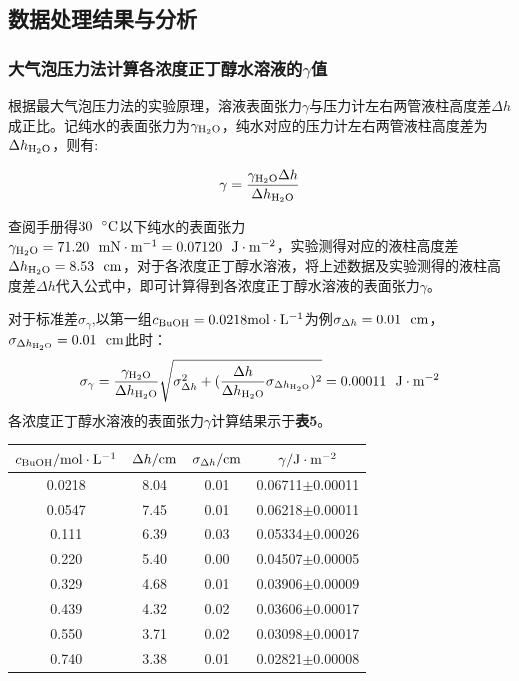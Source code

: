 \documentclass[12pt]{article}
\begin{document}
		\subsection{数据处理结果与分析}
			\subsubsection{大气泡压力法计算各浓度正丁醇水溶液的$\gamma$值}
			根据最大气泡压力法的实验原理，溶液表面张力$\gamma$与压力计左右两管液柱高度差$\Delta h$成正比。记纯水的表面张力为$\gamma_{\rm H_{2}O}$，纯水对应的压力计左右两管液柱高度差为$\Delta h_{\rm H_{2}O}$，则有:\par
			$$
			\gamma=\frac{\gamma_{\rm H_{2}O} \Delta h}{\Delta h_{\rm H_{2}O}}
			$$
			\par
			查阅手册\citealp{crc}得$30\ \ {\rm ^{\circ }C}$以下纯水的表面张力$\gamma_{\rm H_{2}O}=71.20\ \ {\rm mN\cdot m^{-1}=0.07120\ \ {\rm J\cdot m^{-2}}}$，实验测得对应的液柱高度差$\Delta h_{\rm H_{2}O}=8.53\ \ {\rm cm}$，对于各浓度正丁醇水溶液，将上述数据及实验测得的液柱高度差$\Delta h$代入公式中，即可计算得到各浓度正丁醇水溶液的表面张力$\gamma$。\par 
			对于标准差$\sigma_{\gamma}$,以第一组$c_{\rm BuOH}= 0.0218{\rm mol\cdot L^{-1}}$为例$\sigma_{\Delta h}=0.01\ \ {\rm cm}$，$\sigma_{\Delta h_{\rm H_{2}O}}=0.01\ \ {\rm cm}$此时：
			$$
			\sigma_{\gamma}=\frac{\gamma_{\rm H_{2}O}}{\Delta h_{\rm H_{2}O}}\sqrt{\sigma_{\Delta h}^{2}+(\frac{\Delta h}{\Delta h_{\rm H_{2}O}} \sigma_{\Delta h_{\rm H_{2}O}})^{2}}=0.00011\ \ {\rm J\cdot m^{-2}}
			$$
			各浓度正丁醇水溶液的表面张力$\gamma$计算结果示于\textbf{表5}。\par
			\begin{table}[h]
				\centering
				\begin{tabular}{cccc}
					\toprule
					$c_{\rm BuOH}/{\rm mol\cdot L^{-1}}$ & $\Delta h / {\rm cm}$ &$\sigma_{\Delta h}/{\rm cm}$& $\gamma/{\rm J\cdot m^{-2}}$\\
					\midrule
					0.0218 & 8.04& 0.01 &0.06711$\pm$0.00011 \\
					0.0547 & 7.45& 0.01&0.06218$\pm$0.00011\\
					0.111 & 6.39 & 0.03 &0.05334$\pm$0.00026\\
					0.220 & 5.40 & 0.00 &0.04507$\pm$0.00005\\
					0.329 & 4.68 & 0.01 &0.03906$\pm$0.00009\\
					0.439 & 4.32 & 0.02 &0.03606$\pm$0.00017\\
					0.550 & 3.71 & 0.02 &0.03098$\pm$0.00017\\
					0.740 & 3.38 & 0.01 &0.02821$\pm$0.00008\\
					\bottomrule
				\end{tabular}
			\end{table}
					
\end{document}
